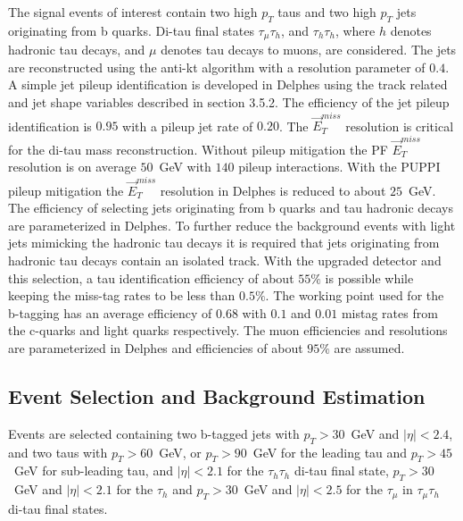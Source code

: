 The signal events of interest contain two high $p_{T}$ taus and two high $p_{T}$ jets originating from b quarks. Di-tau final states $\tau_{\mu}\tau_{h}$, and $\tau_{h}\tau_{h}$, where $h$ denotes hadronic tau decays, and $\mu$ denotes tau decays to muons, are considered. The jets are reconstructed using the anti-kt algorithm with a resolution parameter of $0.4$. A simple jet pileup identification is developed in Delphes using the track related and jet shape variables described in section 3.5.2. The efficiency of the jet pileup identification is $0.95$ with a pileup jet rate of $0.20$. The $\vec{E}_{T}^{miss}$ resolution is critical for the di-tau mass reconstruction. Without pileup mitigation the PF $\vec{E}_{T}^{miss}$ resolution is on average $50$~GeV with $140$ pileup interactions. With the PUPPI pileup mitigation the $\vec{E}_{T}^{miss}$ resolution in Delphes is reduced to about $25$~GeV.  The efficiency of selecting jets originating from b quarks and tau hadronic decays are parameterized in Delphes. To further reduce the background events with light jets mimicking the hadronic tau decays it is required that jets originating from hadronic tau decays contain an isolated track. With the upgraded \phasetwo detector and this selection, a tau identification efficiency of about $55\%$ is possible while keeping the miss-tag rates to be less than $0.5\%$. The working point used for the b-tagging has an average efficiency of $0.68$ with $0.1$ and $0.01$ mistag rates from the c-quarks and light quarks respectively.  The muon efficiencies and resolutions are parameterized in Delphes and efficiencies of about $95\%$ are assumed.

\subsection{Event Selection and Background Estimation}
Events are selected containing two b-tagged jets with $p_{T}>30$~GeV
and $|\eta|<2.4$, and two taus with $p_{T}>60$~GeV, or $p_{T}>90$~GeV
for the leading tau and $p_{T}>45$~GeV for sub-leading tau, and
$|\eta|<2.1$ for the $\tau_{h}\tau_{h}$ di-tau final state, $p_{T}>30$~GeV
and $|\eta|<2.1$  for the $\tau_{h}$ and $p_{T}>30$~GeV and $|\eta|<2.5$
for the $\tau_{\mu}$ in $\tau_{\mu}\tau_{h}$ di-tau final states. 

